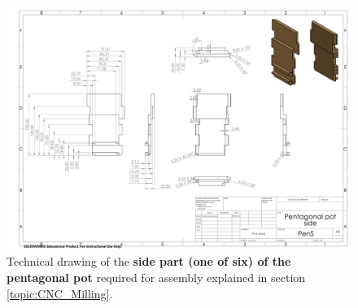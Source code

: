 \documentclass[12pt]{extarticle} %
\begin{document}
\begin{figure}
    \centering
    \includegraphics[width=1\textwidth ]{images/technical_drawings/Pentagonal side-1.png}
    \caption{Technical drawing of the \textbf{side part (one of six) of the pentagonal pot} required for assembly explained in section \ref{topic:CNC_Milling}.}
    \label{technical_drawing:pent_pot_side_part}
\end{figure}
\end{document}

